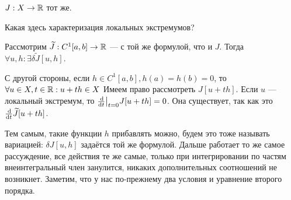 \documentclass[a4paper]{report}
\begin{document}
    $J: X \rightarrow \mathbb{R}$ тот же.

    Какая здесь характеризация локальных экстремумов?

    Рассмотрим $\widetilde{J}: C^1[a, b] \rightarrow \mathbb{R}$ --- с той же формулой, что и $J$. Тогда $\forall u, h: \exists \delta\tilde{J}[u, h]$.

    С другой стороны, если $h \in C^1[a, b], h(a) = h(b) = 0$, то $\forall u \in X, t \in \mathbb{R}: u + th \in X$
    Имеем право рассмотреть $J[u + th]$. Если $u$ --- локальный экстремум, то $\frac{\operatorname{d}\! }{\operatorname{d}\! t}\big|_{t = 0}J[u + th] = 0$.
    Она существует, так как это $\frac{\operatorname{d}\!}{\operatorname{d}\! t}\widetilde{J}[u + th]$.

    Тем самым, такие функции $h$ прибавлять можно, будем это тоже называть вариацией: $\delta J[u, h]$ задаётся той же формулой.
    Дальше работает то же самое рассуждение, все действия те же самые, только при интегрировании по частям внеинтегральный член занулится, никаких дополнительных соотношений не возникнет.
    Заметим, что у нас по-прежнему два условия и уравнение второго порядка.
\end{document}
